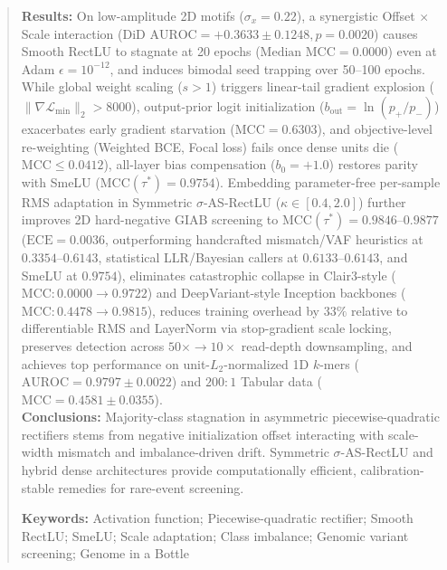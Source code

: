 \documentclass[10pt,a4paper]{article}
\begin{document}
\begin{abstract}
\textbf{Results:} On low-amplitude 2D motifs ($\sigma_x = 0.22$), a synergistic Offset $\times$ Scale interaction ($\text{DiD AUROC} = +0.3633 \pm 0.1248, p = 0.0020$) causes Smooth RectLU to stagnate at 20 epochs ($\text{Median MCC} = 0.0000$) even at Adam $\epsilon = 10^{-12}$, and induces bimodal seed trapping over 50--100 epochs. While global weight scaling ($s > 1$) triggers linear-tail gradient explosion ($\|\nabla \mathcal{L}_{\text{min}}\|_2 > 8000$), output-prior logit initialization ($b_{\text{out}} = \ln(p_+/p_-)$) exacerbates early gradient starvation ($\text{MCC} = 0.6303$), and objective-level re-weighting (Weighted BCE, Focal loss) fails once dense units die ($\text{MCC} \le 0.0412$), all-layer bias compensation ($b_0 = +1.0$) restores parity with SmeLU ($\text{MCC}(\tau^*) = 0.9754$). Embedding parameter-free per-sample RMS adaptation in Symmetric $\sigma$-AS-RectLU ($\kappa \in [0.4, 2.0]$) further improves 2D hard-negative GIAB screening to $\text{MCC}(\tau^*) = 0.9846$--$0.9877$ ($\text{ECE} = 0.0036$, outperforming handcrafted mismatch/VAF heuristics at $0.3354$--$0.6143$, statistical LLR/Bayesian callers at $0.6133$--$0.6143$, and SmeLU at $0.9754$), eliminates catastrophic collapse in Clair3-style ($\text{MCC}: 0.0000 \to 0.9722$) and DeepVariant-style Inception backbones ($\text{MCC}: 0.4478 \to 0.9815$), reduces training overhead by $33\%$ relative to differentiable RMS and LayerNorm via stop-gradient scale locking, preserves detection across $50\times \to 10\times$ read-depth downsampling, and achieves top performance on unit-$L_2$-normalized 1D $k$-mers ($\text{AUROC} = 0.9797 \pm 0.0022$) and $200:1$ Tabular data ($\text{MCC} = 0.4581 \pm 0.0355$). \\
\textbf{Conclusions:} Majority-class stagnation in asymmetric piecewise-quadratic rectifiers stems from negative initialization offset interacting with scale-width mismatch and imbalance-driven drift. Symmetric $\sigma$-AS-RectLU and hybrid dense architectures provide computationally efficient, calibration-stable remedies for rare-event screening.

\vspace{0.4em}
\noindent\textbf{Keywords:} Activation function; Piecewise-quadratic rectifier; Smooth RectLU; SmeLU; Scale adaptation; Class imbalance; Genomic variant screening; Genome in a Bottle
\end{abstract}

\end{document}
